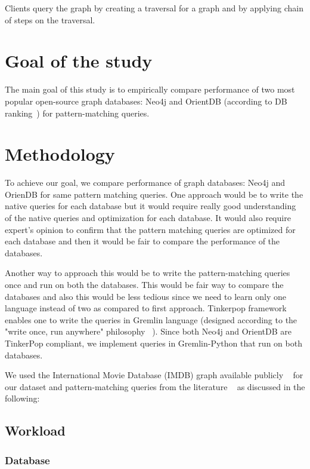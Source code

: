 Clients query the graph by creating a traversal for a graph and by applying chain of steps on the traversal.

\section{Goal of the study}

The main goal of this study is to empirically compare performance of two most popular open-source graph databases: Neo4j and OrientDB (according to DB ranking~\cite{dbranking}) for pattern-matching queries.

\section{Methodology}

To achieve our goal, we compare performance of graph databases: Neo4j and OrienDB for same pattern matching queries. One approach would be to write the native queries for each database but it would require really good understanding of the native queries and optimization for each database. It would also require expert's opinion to confirm that the pattern matching queries are optimized for each database and then it would be fair to compare the performance of the databases.

Another way to approach this would be to write the pattern-matching queries once and run on both the databases. This would be fair way to compare the databases and also this would be less tedious since we need to learn only one language instead of two as compared to first approach. Tinkerpop framework enables one to write the queries in Gremlin language (designed according to the "write once, run anywhere" philosophy ~\cite{gremlin}). Since both Neo4j and OrientDB are TinkerPop compliant, we implement queries in Gremlin-Python that run on both databases. 

We used the International Movie Database (IMDB) graph available publicly ~\cite{IMDb96:online} for our dataset and pattern-matching queries from the literature ~\cite{tripoulthere} as discussed in the following:  

\subsection{Workload}

\subsubsection{Database}

